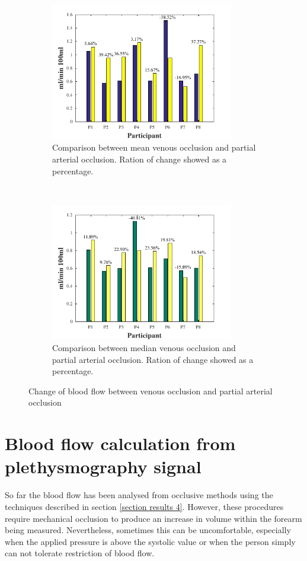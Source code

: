 \begin{figure}[!htbp]
	\centering
	\begin{subfigure}[t]{0.48\textwidth}
		\centering
		\includegraphics[height=6cm,keepaspectratio]{figure14a}    
		\caption{Comparison between mean venous occlusion and partial arterial occlusion. Ration of change showed as a percentage.}
		\label{fig:change_flow_mean}
	\end{subfigure}%
	~ 
	\begin{subfigure}[t]{0.48\textwidth}
		\centering
		\includegraphics[height=6cm,keepaspectratio,keepaspectratio]{figure14b}    
		\caption{Comparison between median venous occlusion and partial arterial occlusion. Ration of change showed as a percentage.}
		\label{fig:change_flow_median}
	\end{subfigure}
	\caption{Change of blood flow between venous occlusion and partial arterial occlusion}
	\label{fig:iPG_flow_comparative}
\end{figure}


\section{Blood flow calculation from plethysmography signal}
\label{section results 5}
So far the blood flow has been analysed from occlusive methods using the techniques described in section \ref{section results 4}. However, these procedures require mechanical occlusion to produce an increase in volume within the forearm being measured. Nevertheless, sometimes this can be uncomfortable, especially when the applied pressure is above the systolic value or when the person simply can not tolerate restriction of blood flow.

